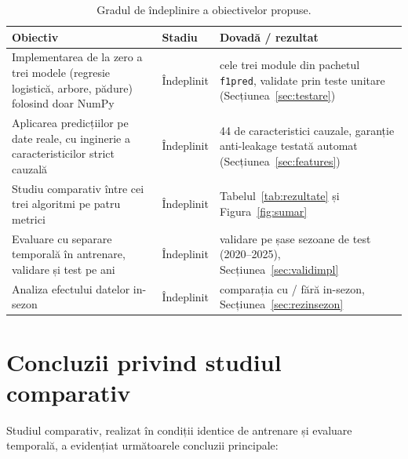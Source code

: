 \documentclass[12pt,a4paper]{report}
\begin{document}
\begin{table}[htbp]
  \centering
  \begin{tabular}{p{6.2cm} l p{6.2cm}}
    \toprule
    \textbf{Obiectiv} & \textbf{Stadiu} & \textbf{Dovadă / rezultat} \\
    \midrule
    Implementarea de la zero a trei modele (regresie logistică, arbore, pădure) folosind doar NumPy
      & Îndeplinit
      & cele trei module din pachetul \texttt{f1pred}, validate prin teste unitare
        (Secțiunea~\ref{sec:testare}) \\
    \addlinespace
    Aplicarea predicțiilor pe date reale, cu inginerie a caracteristicilor strict cauzală
      & Îndeplinit
      & 44 de caracteristici cauzale, garanție anti-leakage testată automat
        (Secțiunea~\ref{sec:features}) \\
    \addlinespace
    Studiu comparativ între cei trei algoritmi pe patru metrici
      & Îndeplinit
      & Tabelul~\ref{tab:rezultate} și Figura~\ref{fig:sumar} \\
    \addlinespace
    Evaluare cu separare temporală în antrenare, validare și test pe ani
      & Îndeplinit
      & validare pe șase sezoane de test (2020--2025), Secțiunea~\ref{sec:validimpl} \\
    \addlinespace
    Analiza efectului datelor in-sezon
      & Îndeplinit
      & comparația cu / fără in-sezon, Secțiunea~\ref{sec:rezinsezon} \\
    \bottomrule
  \end{tabular}
  \caption{Gradul de îndeplinire a obiectivelor propuse.}
  \label{tab:obiective}
\end{table}

\section{Concluzii privind studiul comparativ}

Studiul comparativ, realizat în condiții identice de antrenare și evaluare temporală, a evidențiat
următoarele concluzii principale:
\end{document}
